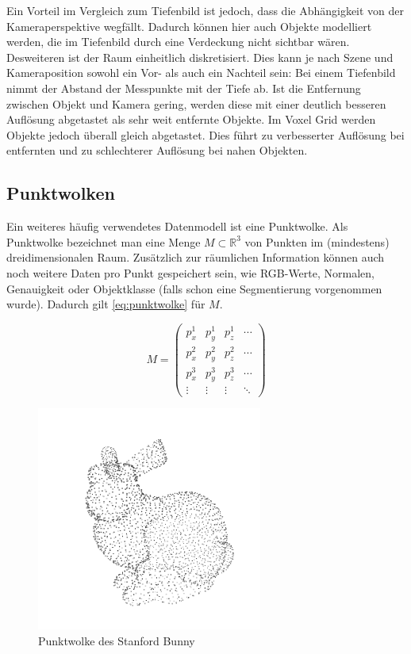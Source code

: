 Ein Vorteil im Vergleich zum Tiefenbild ist jedoch, dass die Abhängigkeit von der Kameraperspektive wegfällt.
Dadurch können hier auch Objekte modelliert werden, die im Tiefenbild durch eine Verdeckung nicht sichtbar wären.
Desweiteren ist der Raum einheitlich diskretisiert.
Dies kann je nach Szene und Kameraposition sowohl ein Vor- als auch ein Nachteil sein:
Bei einem Tiefenbild nimmt der Abstand der Messpunkte mit der Tiefe ab.
Ist die Entfernung zwischen Objekt und Kamera gering, werden diese mit einer deutlich besseren Auflösung abgetastet als sehr weit entfernte Objekte.
Im Voxel Grid werden Objekte jedoch überall gleich abgetastet.
Dies führt zu verbesserter Auflösung bei entfernten und zu schlechterer Auflösung bei nahen Objekten.


\subsection{Punktwolken}
\label{subsec:punktwolken}

Ein weiteres häufig verwendetes Datenmodell ist eine Punktwolke.
Als Punktwolke bezeichnet man eine Menge $M \subset \mathbb{R}^3$ von Punkten im (mindestens) dreidimensionalen Raum.
Zusätzlich zur räumlichen Information können auch noch weitere Daten pro Punkt gespeichert sein, wie RGB-Werte, Normalen, Genauigkeit oder Objektklasse (falls schon eine Segmentierung vorgenommen wurde).
Dadurch gilt \autoref{eq:punktwolke} für $M$.

\begin{equation}
M = \begin{pmatrix}
p_x^1 & p_y^1 & p_z^1 & \cdots\\
p_x^2 & p_y^2 & p_z^2 & \cdots\\
p_x^3 & p_y^3 & p_z^3 & \cdots\\
\vdots & \vdots & \vdots & \ddots
\end{pmatrix}
\label{eq:punktwolke}
\end{equation}

\begin{figure}[ht]
	\centering
	\includegraphics[width=0.66\textwidth, frame]{images/bunny_pcd.png}
	\caption{Punktwolke des Stanford Bunny \cite{stanfordbunny}}
	\label{fig:bunny_pcd}
\end{figure}

